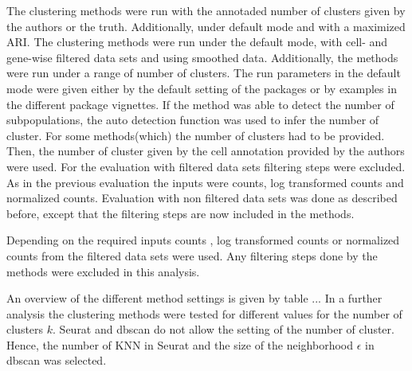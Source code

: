 \documentclass[11pt, a4paper]{article}\usepackage[]{graphicx}\usepackage[]{color}
\begin{document}
The clustering methods were run with the annotaded number of clusters given by the authors or the truth. Additionally, under default mode and with a maximized ARI. 
The clustering methods were run under the default mode, with cell- and gene-wise filtered data sets and using smoothed data. Additionally, the methods were run under a range of number of clusters.
The run parameters in the default mode were given either by the default setting of the packages or by examples in the different package vignettes. If the method was able to detect the number of subpopulations, the auto detection function was used to infer the number of cluster. For some methods(which) the number of clusters had to be provided. Then, the number of cluster given by the cell annotation provided by the authors were used. 
For the evaluation with filtered data sets filtering steps were excluded. As in the previous evaluation the inputs were counts, log transformed counts and normalized counts. 
Evaluation with non filtered data sets was done as described before, except that the filtering steps are now included in the methods.

Depending on the required inputs counts , log transformed counts  or normalized counts  from the  filtered data sets were used. Any filtering steps done by the methods were excluded in this analysis.

An overview of the different method settings is given by table ...
In a further analysis the clustering methods were tested for different values for the number of clusters $k$. Seurat and dbscan do not allow the setting of the number of cluster. Hence, the number of KNN in Seurat and the size of the neighborhood $\epsilon$ in dbscan was selected.
\end{document}
